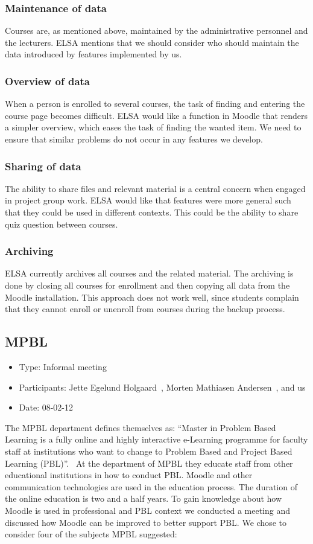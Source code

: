 \subsubsection{Maintenance of data} Courses are, as mentioned above, maintained by the administrative personnel and the lecturers.
ELSA mentions that we should consider who should maintain the data introduced by features implemented by us.


\subsubsection{Overview of data} When a person is enrolled to several courses, the task of finding and entering the course page becomes difficult. 
ELSA would like a function in Moodle that renders a simpler overview, which eases the task of finding the wanted item.
We need to ensure that similar problems do not occur in any features we develop.

\subsubsection{Sharing of data} The ability to share files and relevant material is a central concern when engaged in project group work.
ELSA would like that features were more general such that they could be used in different contexts.
This could be the ability to share quiz question between courses. 

\subsubsection{Archiving} ELSA currently archives all courses and the related material. 
The archiving is done by closing all courses for enrollment and then copying all data from the Moodle installation. 
This approach does not work well, since students complain that they cannot enroll or unenroll from courses during the backup process. 

\subsection{MPBL}
\label{sub:mpblInterview}
\begin{itemize}
	\item Type: Informal meeting
	\item Participants: Jette Egelund Holgaard~\cite{jette}, Morten Mathiasen Andersen~\cite{morten}, and us
	\item Date: 08-02-12
\end{itemize}
The MPBL department defines themselves as:
``Master in Problem Based Learning is a fully online and highly interactive e-Learning programme for faculty staff at institutions who want to change to Problem Based and Project Based Learning (PBL)''.~\cite{mpbl}
At the department of MPBL they educate staff from other educational institutions in how to conduct PBL.
Moodle and other communication technologies are used in the education process. 
The duration of the online education is two and a half years.
To gain knowledge about how Moodle is used in professional and PBL context we conducted a meeting and discussed how Moodle can be improved to better support PBL. 
We chose to consider four of the subjects MPBL suggested:

